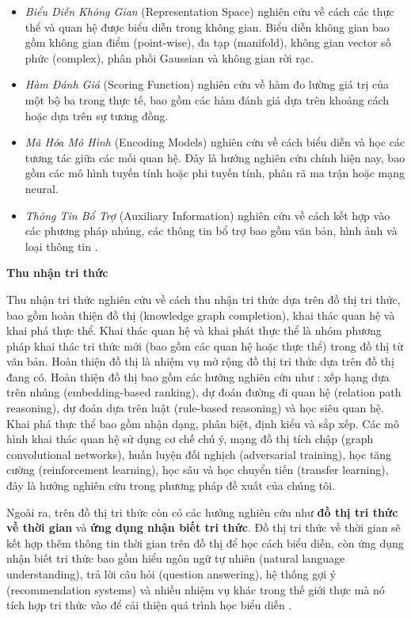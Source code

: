 \begin{itemize}
	\item \textit{Biểu Diễn Không Gian} (Representation Space) nghiên cứu về cách các thực thể và quan hệ được biểu diễn trong không gian. Biểu diễn không gian bao gồm không gian điểm (point-wise), đa tạp (manifold), không gian vector số phức (complex), phân phối Gaussian và không gian rời rạc.
	
	\item \textit{Hàm Đánh Giá} (Scoring Function) nghiên cứu về hàm đo lường giá trị của một bộ ba trong thực tế, bao gồm các hàm đánh giá dựa trên khoảng cách hoặc dựa trên sự tương đồng.
	
	\item \textit{Mã Hóa Mô Hình} (Encoding Models) nghiên cứu về cách biểu diễn và học các tương tác giữa các mối quan hệ. Đây là hướng nghiên cứu chính hiện nay, bao gồm các mô hình tuyến tính hoặc phi tuyến tính, phân rã ma trận hoặc mạng neural.
	
	\item \textit{Thông Tin Bổ Trợ} (Auxiliary Information) nghiên cứu về cách kết hợp vào các phương pháp nhúng, các thông tin bổ trợ bao gồm văn bản, hình ảnh và loại thông tin .
\end{itemize}

\textbf{Thu nhận tri thức}

Thu nhận tri thức nghiên cứu về cách thu nhận tri thức dựa trên đồ thị tri thức, bao gồm hoàn thiện đồ thị (knowledge graph completion), khai thác quan hệ và khai phá thực thể. Khai thác quan hệ và khai phát thực thể là nhóm phương pháp khai thác tri thức mới (bao gồm các quan hệ hoặc thực thể) trong đồ thị từ văn bản. Hoàn thiện đồ thị là nhiệm vụ mở rộng đồ thị tri thức dựa trên đồ thị đang có. Hoàn thiện đồ thị bao gồm các hướng nghiên cứu như : xếp hạng dựa trên nhúng (embedding-based ranking), dự đoán đường đi quan hệ (relation path reasoning), dự đoán dựa trên luật (rule-based reasoning) và học siêu quan hệ.
Khai phá thực thể bao gồm nhận dạng, phân biệt, định kiểu và sắp xếp. 
Các mô hình khai thác quan hệ sử dụng cơ chế chú ý, mạng đồ thị tích chập (graph
convolutional networks), huấn luyện đối nghịch (adversarial training), học tăng cường (reinforcement learning), học sâu và học chuyển tiến (transfer learning), đây là hướng nghiên cứu trong phương pháp đề xuất của chúng tôi.

Ngoài ra, trên đồ thị tri thức còn có các hướng nghiên cứu như \textbf{đồ thị tri thức về thời gian} và \textbf{ứng dụng nhận biết tri thức}. Đồ thị tri thức về thời gian sẽ kết hợp thêm thông tin thời gian trên đồ thị để học cách biểu diễn, còn ứng dụng nhận biết tri thức bao gồm hiểu ngôn ngữ tự nhiên (natural language understanding), trả lời câu hỏi (question answering), hệ thống gợi ý (recommendation systems) và nhiều nhiệm vụ khác trong thế giới thực mà nó tích hợp tri thức vào để cải thiện quá trình học biểu diễn .


